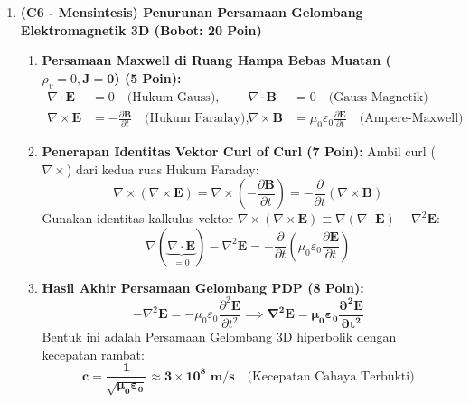 \documentclass[11pt,a4paper]{article}
\begin{document}
\begin{enumerate}[label=\textbf{Soal \arabic*.}]
    \item \textbf{(C6 - Mensintesis) Penurunan Persamaan Gelombang Elektromagnetik 3D (Bobot: 20 Poin)}
    \begin{tcolorbox}[colback=green!5!white,colframe=green!60!black,title=Solusi Model:]
    \begin{enumerate}
        \item \textbf{Persamaan Maxwell di Ruang Hampa Bebas Muatan ($\rho_v=0, \mathbf{J}=\mathbf{0}$) (5 Poin):}
        \begin{align*}
            \nabla \cdot \mathbf{E} &= 0 \quad \text{(Hukum Gauss)}, & \nabla \cdot \mathbf{B} &= 0 \quad \text{(Gauss Magnetik)} \\
            \nabla \times \mathbf{E} &= -\frac{\partial \mathbf{B}}{\partial t} \quad \text{(Hukum Faraday)}, & \nabla \times \mathbf{B} &= \mu_0 \varepsilon_0 \frac{\partial \mathbf{E}}{\partial t} \quad \text{(Ampere-Maxwell)}
        \end{align*}
        \item \textbf{Penerapan Identitas Vektor Curl of Curl (7 Poin):}
        Ambil curl ($\nabla \times$) dari kedua ruas Hukum Faraday:
        $$ \nabla \times (\nabla \times \mathbf{E}) = \nabla \times \left(-\frac{\partial \mathbf{B}}{\partial t}\right) = -\frac{\partial}{\partial t}(\nabla \times \mathbf{B}) $$
        Gunakan identitas kalkulus vektor $\nabla \times (\nabla \times \mathbf{E}) \equiv \nabla(\nabla \cdot \mathbf{E}) - \nabla^2 \mathbf{E}$:
        $$ \nabla(\underbrace{\nabla \cdot \mathbf{E}}_{=0}) - \nabla^2 \mathbf{E} = -\frac{\partial}{\partial t}\left(\mu_0 \varepsilon_0 \frac{\partial \mathbf{E}}{\partial t}\right) $$
        \item \textbf{Hasil Akhir Persamaan Gelombang PDP (8 Poin):}
        $$ -\nabla^2 \mathbf{E} = -\mu_0 \varepsilon_0 \frac{\partial^2 \mathbf{E}}{\partial t^2} \implies \mathbf{\nabla^2 \mathbf{E} = \mu_0 \varepsilon_0 \frac{\partial^2 \mathbf{E}}{\partial t^2}} $$
        Bentuk ini adalah Persamaan Gelombang 3D hiperbolik dengan kecepatan rambat:
        $$ \mathbf{c = \frac{1}{\sqrt{\mu_0 \varepsilon_0}} \approx 3 \times 10^8 \text{ m/s}} \quad \text{(Kecepatan Cahaya Terbukti)} $$
    \end{enumerate}
    \end{tcolorbox}
\end{enumerate}
\end{document}
